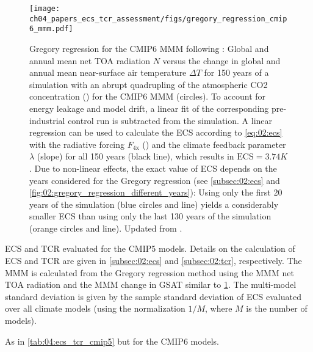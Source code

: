 \begin{figure}[t]
  \centering
  \texttt{[image: 
    ch04\_papers\_ecs\_tcr\_assessment/figs/gregory\_regression\_cmip6\_mmm.pdf]}
  \caption{Gregory regression for the \acs{CMIP}6 \acf{MMM} following
    \textcite{Gregory2004}: Global and annual mean net \acl{TOA} radiation $N$
    versus the change in global and annual mean near-surface air temperature
    $\Delta T$ for 150 years of a simulation with an abrupt quadrupling of the
    atmospheric \acs{CO2} concentration () for the \acs{CMIP}6
    \acs{MMM} (circles). To account for energy leakage and model drift, a
    linear fit of the corresponding pre-industrial control run is subtracted
    from the  simulation. A linear regression can be used to
    calculate the \acf{ECS} according to \cref{eq:02:ecs} with the radiative
    forcing $F_\text{4x}$ (\yintercept) and the climate feedback parameter
    $\lambda$ (slope) for all 150 years (black line), which results in
    $\text{ECS} = 3.74 \unit{K}$. Due to non-linear effects, the exact value
    of \acs{ECS} depends on the years considered for the Gregory regression
    (see \cref{subsec:02:ecs} and
    \cref{fig:02:gregory_regression_different_years}): Using only the first 20
    years of the simulation (blue circles and line) yields a considerably
    smaller \acs{ECS} than using only the last 130 years of the simulation
    (orange circles and line). Updated from \textcite{Meehl2020}.}
  \label{fig:04:gregory_regression_cmip6_mmm}
\end{figure}

\begin{table}[!t]
  \centering
  \caption{\acf{ECS} and \acf{TCR} evaluated for the \acs{CMIP}5 models.
    Details on the calculation of \acs{ECS} and \acs{TCR} are given in
    \cref{subsec:02:ecs} and \cref{subsec:02:tcr}, respectively. The \acf{MMM}
    is calculated from the Gregory regression method using the \acs{MMM} net
    \acf{TOA} radiation and the \acs{MMM} change in \acf{GSAT} similar to
    \cref{fig:04:gregory_regression_cmip6_mmm}. The multi-model standard
    deviation is given by the sample standard deviation of \acs{ECS} evaluated
    over all climate models (using the normalization $1 / M$, where $M$ is the
    number of models).}
  \label{tab:04:ecs_tcr_cmip5}
\end{table}

\begin{table}[p]
  \centering
  \caption{As in \cref{tab:04:ecs_tcr_cmip5} but for the \acs{CMIP}6 models.}
  \label{tab:04:ecs_tcr_cmip6}
\end{table}

